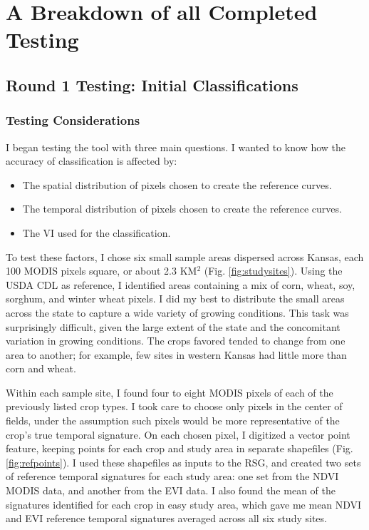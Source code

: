 \chapter{A Breakdown of all Completed Testing}
\label{}

\section{Round 1 Testing: Initial Classifications}
\subsection*{Testing Considerations}

I began testing the tool with three main questions. I wanted to know how the accuracy of classification is affected by:

\begin{Spacing}{1.2}
\begin{itemize}
  \item The spatial distribution of pixels chosen to create the reference curves.
  \item The temporal distribution of pixels chosen to create the reference curves.
  \item The VI used for the classification.
\end{itemize}
\end{Spacing}

To test these factors, I chose six small sample areas dispersed across Kansas, each 100 MODIS pixels square, or about 2.3 KM$^2$ (Fig. \ref{fig:studysites}). Using the USDA CDL as reference, I identified areas containing a mix of corn, wheat, soy, sorghum, and winter wheat pixels. I did my best to distribute the small areas across the state to capture a wide variety of growing conditions. This task was surprisingly difficult, given the large extent of the state and the concomitant variation in growing conditions. The crops favored tended to change from one area to another; for example, few sites in western Kansas had little more than corn and wheat.

Within each sample site, I found four to eight MODIS pixels of each of the previously listed crop types. I took care to choose only pixels in the center of fields, under the assumption such pixels would be more representative of the crop’s true temporal signature. On each chosen pixel, I digitized a vector point feature, keeping points for each crop and study area in separate shapefiles  (Fig. \ref{fig:refpoints}). I used these shapefiles as inputs to the RSG, and created two sets of reference temporal signatures for each study area: one set from the NDVI MODIS data, and another from the EVI data. I also found the mean of the signatures identified for each crop in easy study area, which gave me mean NDVI and EVI reference temporal signatures averaged across all six study sites.

